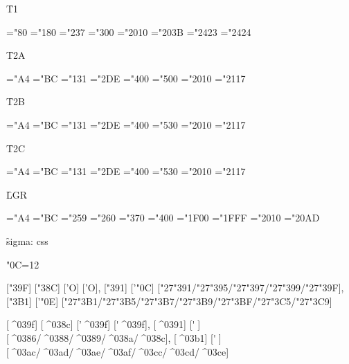 {\f T1}

\ToneZZZSerifRegular
\ChrA="80 \ChrB="180
\PrintCode
\ChrA="237 \ChrB="300
\PrintCode
\ChrA="2010 \ChrB="203B
\PrintCode
\ChrA="2423 \ChrB="2424
\PrintCode

{\f T2A}

\TtwoaZZZSerifRegular
\ChrA="A4 \ChrB="BC
\PrintCode
\ChrA="131 \ChrB="2DE
\PrintCode
\ChrA="400 \ChrB="500
\PrintCode
\ChrA="2010 \ChrB="2117
\PrintCode

{\f T2B}

\TtwobZZZSerifRegular
\ChrA="A4 \ChrB="BC
\PrintCode
\ChrA="131 \ChrB="2DE
\PrintCode
\ChrA="400 \ChrB="530
\PrintCode
\ChrA="2010 \ChrB="2117
\PrintCode

{\f T2C}

\TtwocZZZSerifRegular
\ChrA="A4 \ChrB="BC
\PrintCode
\ChrA="131 \ChrB="2DE
\PrintCode
\ChrA="400 \ChrB="530
\PrintCode
\ChrA="2010 \ChrB="2117
\PrintCode

{\f LGR}

\LgrZZZSerifRegular
\ChrA="A4 \ChrB="BC
\PrintCode
\ChrA="259 \ChrB="260
\PrintCode
\ChrA="370 \ChrB="400
\PrintCode
\ChrA="1F00 \ChrB="1FFF
\PrintCode
\ChrA="2010 \ChrB="20AD
\PrintCode

{\f sigma:} ^^63^^73^^73

\catcode"0C=12

[\char"39F] [\char"38C] ['\relax Ο] ['Ο],
[\char"391] ['\char"0C] [\char"27\char"391/\char"27\char"395/\char"27\char"397/\char"27\char"399/\char"27\char"39F],
[\char"3B1] ['\char"0E] [\char"27\char"3B1/\char"27\char"3B5/\char"27\char"3B7/\char"27\char"3B9/\char"27\char"3BF/\char"27\char"3C5/\char"27\char"3C9]

[^^^^039f] [^^^^038c] ['\relax ^^^^039f] [^^27^^^^039f],
[^^^^0391] [^^27^^0c] [^^^^0386/^^^^0388/^^^^0389/^^^^038a/^^^^038c],
[^^^^03b1] [^^27^^0e] [^^^^03ac/^^^^03ad/^^^^03ae/^^^^03af/^^^^03cc/^^^^03cd/^^^^03ce]

\bye
